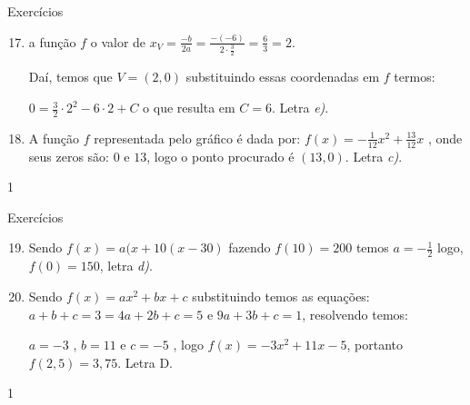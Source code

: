 \clearmargin
\begin{answer}{Exercícios}
{\exerciselist
\begin{enumerate}\setcounter{enumi}{16}
\item a função \(f\) o valor de \(x_V=\frac{-b}{2a}=\frac{-(-6)}{2\cdot\frac{3}{2}}=\frac{6}{3}=2\).

Daí, temos que \(V=(2,0)\) substituindo essas coordenadas em \(f\) termos:

\(0=\frac{3}{2}\cdot2^2-6\cdot2+C\) o que resulta em \(C=6\). Letra \textit{e)}.


\item A função \(f\) representada pelo gráfico é dada por: \(f(x)=-\frac{1}{12}x^2+\frac{13}{12}x\) , onde seus zeros são: \(0\) e \(13\), logo o ponto procurado é \((13,0)\). Letra \textit{c)}.

\end{enumerate}
}{1}
\end{answer}
\clearmargin
\begin{answer}{Exercícios}
{\exerciselist
\begin{enumerate}\setcounter{enumi}{18}
\item Sendo \(f(x)=a(x+10(x-30)\) fazendo \(f(10)=200\) temos \(a=-\frac{1}{2}\) logo, \(f(0)=150\), letra \textit{d)}.

\item Sendo \(f(x)=ax^2+bx+c\) substituindo temos as equações:
\(a+b+c=3=4a+2b+c=5\)  e  \(9a+3b+c=1\), resolvendo temos:

\(a=-3\) , \(b=11\) e \(c=-5\) , logo \(f(x)=-3x^2+11x-5\), portanto \(f(2,5)=3,75\). Letra D.
\end{enumerate}
}{1}
\end{answer}
\clearmargin
